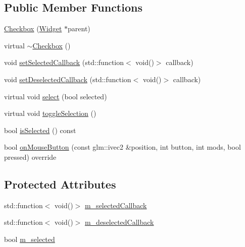 \subsection*{Public Member Functions}
\begin{DoxyCompactItemize}
\item 
\mbox{\hyperlink{classec__gui_1_1_checkbox_ae5f2c4a6e7ea07282d4770be2486525c}{Checkbox}} (\mbox{\hyperlink{classec__gui_1_1_widget}{Widget}} $\ast$parent)
\item 
virtual \mbox{\hyperlink{classec__gui_1_1_checkbox_a819cbb2a47519c323bffb47a4b629818}{$\sim$\+Checkbox}} ()
\item 
void \mbox{\hyperlink{classec__gui_1_1_checkbox_aa2309c3532738568581cf0e5748ba6d3}{set\+Selected\+Callback}} (std\+::function$<$ void()$>$ callback)
\item 
void \mbox{\hyperlink{classec__gui_1_1_checkbox_a100ada16e9dfbb5a65f29f7fe98e5ac5}{set\+Deselected\+Callback}} (std\+::function$<$ void()$>$ callback)
\item 
virtual void \mbox{\hyperlink{classec__gui_1_1_checkbox_a3aee4963557c5f5cd626ec1050082c5c}{select}} (bool selected)
\item 
virtual void \mbox{\hyperlink{classec__gui_1_1_checkbox_aaec883d6b246a4d6840f7187150e8314}{toggle\+Selection}} ()
\item 
bool \mbox{\hyperlink{classec__gui_1_1_checkbox_a2598cbc2e320cc2ba6b318c93a9537d8}{is\+Selected}} () const
\item 
bool \mbox{\hyperlink{classec__gui_1_1_checkbox_a2c9a4610ead12fd4cb8cb7e4fe38f169}{on\+Mouse\+Button}} (const glm\+::ivec2 \&position, int button, int mods, bool pressed) override
\end{DoxyCompactItemize}
\subsection*{Protected Attributes}
\begin{DoxyCompactItemize}
\item 
std\+::function$<$ void()$>$ \mbox{\hyperlink{classec__gui_1_1_checkbox_ae1f5d67ca2f0e54930ac1a7fcf39fe05}{m\+\_\+selected\+Callback}}
\item 
std\+::function$<$ void()$>$ \mbox{\hyperlink{classec__gui_1_1_checkbox_a67f81ba535c95503bb2f8b66db35e594}{m\+\_\+deselected\+Callback}}
\item 
bool \mbox{\hyperlink{classec__gui_1_1_checkbox_aa5c7879c4d6422bd5c0fd96edc484a88}{m\+\_\+selected}}
\end{DoxyCompactItemize}
